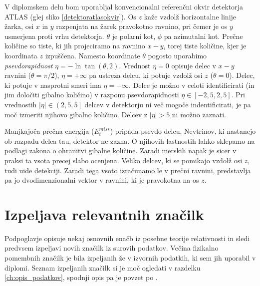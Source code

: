 \documentclass[11pt,a4paper,openany]{book}
\begin{document}
V diplomskem delu bom uporabljal konvencionalni referenčni okvir detektorja ATLAS (glej sliko \ref{detektoratlasokvir}). Os $z$ kaže vzdolž horizontalne linije žarka, osi $x$ in $y$ razpenjata na žarek pravokotno ravnino, pri čemer je os $y$ usmerjena proti vrhu detektorja. $\theta$ je polarni kot, $\phi$ pa azimutalni kot. Prečne količine so tiste, ki jih projeciramo na ravnino $x-y$, torej tiste količine, kjer je koordinata $z$ izpuščena. Namesto koordinate $\theta$ pogosto uporabimo \textit{psevdorapidnost} $\eta = -\ln \tan(\theta, 2)$. Vrednost $\eta = 0$ opisuje delec v $x-y$ ravnini ($\theta = \pi/2$), $\eta = +\infty$ pa ustreza delcu, ki potuje vzdolž osi $z$ ($\theta = 0$). Delec, ki potuje v nasprotni smeri ima $\eta = -\infty$. Delce je možno v celoti identificirati (in jim določiti gibalno količino) v razponu psevdorapidnosti $\eta \in \left[-2,5, 2,5 \right]$. Pri vrednostih $|\eta| \in \left(2,5, 5\right]$ delcev v detektorju ni več mogoče indentificirati, je pa moč izmeriti njihovo gibalno količino. Delcev z $|\eta| > 5$ ni možno zaznati.

Manjkajoča prečna energija ($E^{miss}_t$) pripada psevdo delcu. Nevtrinov, ki nastanejo ob razpadu delca tau, detektor ne zazna. O njihovih lastnostih lahko sklepamo na podlagi zakona o ohranitvi gibalne količine. Zaradi merskih napak je sicer v praksi ta vsota precej slabo ocenjena. Veliko delcev, ki se pomikajo vzdolž osi $z$, tudi uide detekciji. Zaradi tega vsoto izračunamo le v prečni ravnini, predstavlja pa jo dvodimenzionalni vektor v ravnini, ki je pravokotna na os $z$.

\section{Izpeljava relevantnih značilk}
Podpoglavje opisuje nekaj osnovnih enačb iz posebne teorije relativnosti in sledi predvsem izpeljavi novih značilk iz surovih podatkov. Večina fizikalno pomembnih značilk je bila izpeljanih že v izvornih podatkih, ki sem jih uporabil v diplomi. Seznam izpeljanih značilk si je moč ogledati v razdelku \ref{ch:opis_podatkov}, spodnji opis pa je povzet po \cite{ChallengeDoc}.
\end{document}
